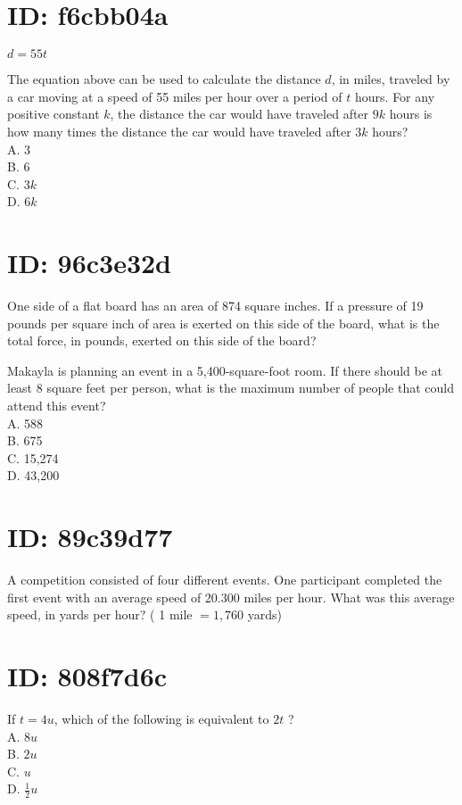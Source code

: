 \section*{ID: f6cbb04a}
$d=55 t$

The equation above can be used to calculate the distance $d$, in miles, traveled by a car moving at a speed of 55 miles per hour over a period of $t$ hours. For any positive constant $k$, the distance the car would have traveled after $9 k$ hours is how many times the distance the car would have traveled after $3 k$ hours?\\
A. 3\\
B. 6\\
C. $3 k$\\
D. $6 k$

\section*{ID: 96c3e32d}
One side of a flat board has an area of 874 square inches. If a pressure of 19 pounds per square inch of area is exerted on this side of the board, what is the total force, in pounds, exerted on this side of the board?

Makayla is planning an event in a 5,400-square-foot room. If there should be at least 8 square feet per person, what is the maximum number of people that could attend this event?\\
A. 588\\
B. 675\\
C. 15,274\\
D. 43,200

\section*{ID: 89c39d77}
A competition consisted of four different events. One participant completed the first event with an average speed of 20.300 miles per hour. What was this average speed, in yards per hour? ( 1 mile $=1,760$ yards)

\section*{ID: 808f7d6c}
If $t=4 u$, which of the following is equivalent to $2 t$ ?\\
A. $8 u$\\
B. $2 u$\\
C. $u$\\
D. $\frac{1}{2} u$

